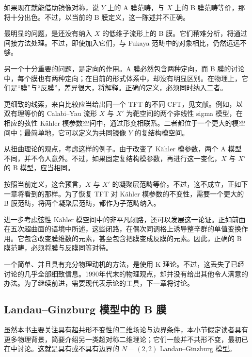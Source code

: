 如果现在就能借助镜像对称，说 $Y$ 上的 A 膜范畴，与 $X$ 上的 B 膜范畴等价，那将十分出色。不过，以当前的 B 膜定义，这一陈述并不正确。

最明显的问题，是还没有纳入 $X$ 的低维子流形上的 B 膜。它们稍难分析，将通过间接方法处理。不过，即使加入它们，与 Fukaya 范畴中的对象相比，仍然远远不够。

另一个十分重要的问题，是定向的作用。A 膜必然包含两种定向，而 B 膜的讨论中，每个膜也有两种定向；在目前的形式体系中，却没有明显区别。在物理上，它们是“膜”与“反膜”，差异很大，将解释。正确的定义，必须同时纳入二者。

更细致的线索，来自比较应当给出同一个 TFT 的不同 CFT，见文献。例如，以双有理等价的 Calabi--Yau 流形 $X$ 与 $X'$ 为靶空间的两个非线性 sigma 模型，在相应的弦性 K\"ahler 模参数空间中，通过形变相联系。二者都位于一个更大的模空间中；最简单地，它可以定义为共同镜像 $Y$ 的复结构模空间。

从扭曲理论的观点，考虑这样的例子。由于改变了 K\"ahler 模参数，两个 A 模型不同，并不令人意外。不过，如果固定复结构模参数，再进行这一变化，$X$ 与 $X'$ 的 B 模型，应当相同。

按照当前定义，这会预言，$X$ 与 $X'$ 的凝聚层范畴等价。不过，这不成立，正如下一章将看到的那样。为了恢复 TFT 对 K\"ahler 模参数的不变性，需要一个更大的 B 膜范畴，将两个凝聚层范畴，都作为子范畴纳入。

进一步考虑弦性 K\"ahler 模空间中的非平凡闭路，还可以发展这一论证。正如前面在五次超曲面的语境中所述，这些闭路，在偶次同调格上诱导整辛群的单值变换作用。它包含改变膜维数的元素，甚至包含把膜变成反膜的元素。因此，正确的 B 膜范畴，必须将膜与反膜同等对待。

一个简单、并且具有充分物理动机的方法，是使用 K 理论。不过，这丢失了已经讨论的几乎全部细致信息。1990年代末的物理观点，却并没有给出其他令人满意的办法。为了继续前进，需要现代表示论的工具，下一章将讨论。

\subsection{Landau--Ginzburg 模型中的 B 膜}\label{sec:3.6.8}

虽然本书主要关注具有超共形不变性的二维场论与边界条件，本小节假定读者具有更多物理背景，简要介绍另一类超对称二维理论；它们一般并不共形不变，最初已在中讨论。这就是具有或不具有边界的 $N=(2,2)$ Landau--Ginzburg 模型。

